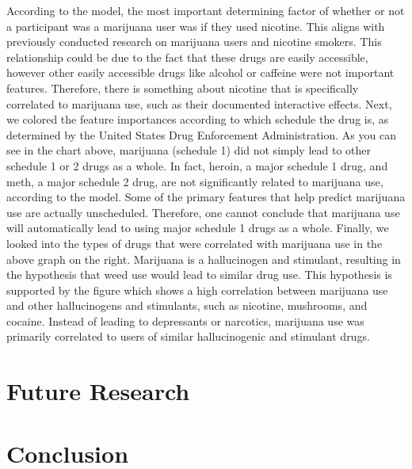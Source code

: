 \documentclass{article}
\begin{document}
According to the model, the most important determining factor of whether or not a participant was a marijuana user was if they used nicotine. This aligns with previously conducted research on marijuana users and nicotine smokers. This relationship could be due to the fact that these drugs are easily accessible, however other easily accessible drugs like alcohol or caffeine were not important features. Therefore, there is something about nicotine that is specifically correlated to marijuana use, such as their documented interactive effects. Next, we colored the feature importances according to which schedule the drug is, as determined by the United States Drug Enforcement Administration. As you can see in the chart above, marijuana (schedule 1) did not simply lead to other schedule 1 or 2 drugs as a whole. In fact, heroin, a major schedule 1 drug, and meth, a major schedule 2 drug, are not significantly related to marijuana use, according to the model. Some of the primary features that help predict marijuana use are actually unscheduled. Therefore, one cannot conclude that marijuana use will automatically lead to using major schedule 1 drugs as a whole. Finally, we looked into the types of drugs that were correlated with marijuana use in the above graph on the right. Marijuana is a hallucinogen and stimulant, resulting in the hypothesis that weed use would lead to similar drug use. This hypothesis is supported by the figure which shows a high correlation between marijuana use and other hallucinogens and stimulants, such as nicotine, mushrooms, and cocaine. Instead of leading to depressants or narcotics, marijuana use was primarily correlated to users of similar hallucinogenic and stimulant drugs.

\section{Future Research}

\section{Conclusion}
\end{document}
